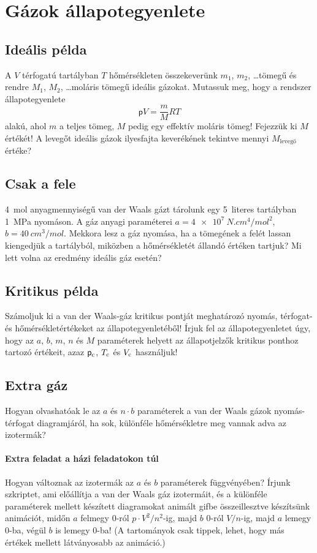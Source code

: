\documentclass[12pt,a4paper]{scrartcl}
\newcommand{\pres}{\mathsf p}	%
\begin{document}
\section{Gázok állapotegyenlete}
\subsection{Ideális példa}
A $V$ térfogatú tartályban $T$ hőmérsékleten összekeverünk $m_1$, $m_2$, \ldots tömegű és rendre $M_1$, $M_2$, \ldots moláris tömegű ideális gázokat. Mutassuk meg, hogy a rendszer állapotegyenlete
\[\pres V = \frac{m}{M}RT\]
alakú, ahol $m$ a teljes tömeg, $M$ pedig egy effektív moláris tömeg! Fejezzük ki $M$ értékét! A levegőt ideális gázok ilyesfajta keverékének tekintve mennyi $M_{\text{levegő}}$ értéke?

\subsection{Csak a fele}
\SI{4}{mol}
 anyagmennyiségű van der Waals gázt tárolunk egy \SI{5}{literes}
  tartályban \SI{1}{MPa} nyomáson. A gáz anyagi paraméterei 
  $a=\SI{4e7}{N.cm^4/mol^2}$, 
  $b=\SI{40}{cm^3/mol}$. Mekkora lesz a gáz nyomása, ha a tömegének a felét lassan kiengedjük a tartályból, miközben a hőmérsékletét állandó értéken tartjuk? Mi lett volna az eredmény ideális gáz esetén?
  
\subsection{Kritikus példa}
Számoljuk ki a van der Waals-gáz kritikus pontját meghatározó nyomás, térfogat- és hőmérsékletértékeket az állapotegyenletéből! Írjuk fel az állapotegyenletet úgy, hogy az $a$, $b$, $m$, $n$ és $M$ paraméterek helyett az állapotjelzők kritikus ponthoz tartozó értékeit, azaz $\pres_\text c$, $T_\text c$ és $V_\text c$ használjuk!

\subsection{Extra gáz}
Hogyan olvashatóak le az $a$ és $n \cdot b$ paraméterek a van der Waals gázok nyomás-térfogat diagramjáról, ha sok, különféle hőmérsékletre meg vannak adva az izotermák?

\paragraph{Extra feladat a házi feladatokon túl}
Hogyan változnak az izotermák az $a$ és $b$ paraméterek függvényében? Írjunk szkriptet, ami előállítja a van der Waals gáz izotermáit, és a különféle paraméterek mellett készített diagramokat animált gifbe összeillesztve készítsünk animációt, midőn $a$ felmegy 0-ról $p \cdot V^2/n^2$-ig, majd $b$ 0-ról $V/n$-ig, majd $a$ lemegy 0-ba, végül $b$ is lemegy $0$-ba! (A tartományok csak tippek, lehet, hogy más értékek mellett látványosabb az animáció.)
\end{document}
